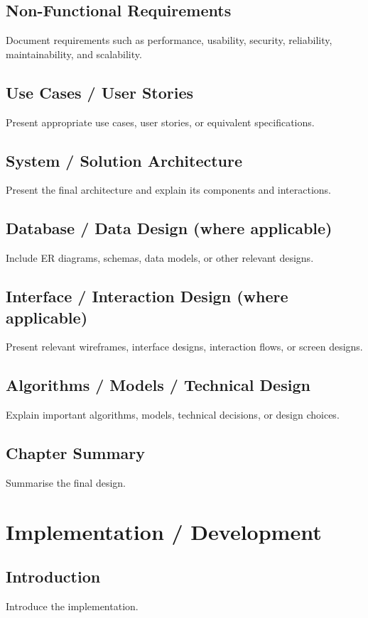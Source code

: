 \documentclass[12pt,a4paper]{report}
\begin{document}
\section{Non-Functional Requirements}
Document requirements such as performance, usability, security, reliability, maintainability, and scalability.

\section{Use Cases / User Stories}
Present appropriate use cases, user stories, or equivalent specifications.

\section{System / Solution Architecture}
Present the final architecture and explain its components and interactions.

\section{Database / Data Design (where applicable)}
Include ER diagrams, schemas, data models, or other relevant designs.

\section{Interface / Interaction Design (where applicable)}
Present relevant wireframes, interface designs, interaction flows, or screen designs.

\section{Algorithms / Models / Technical Design}
Explain important algorithms, models, technical decisions, or design choices.

\section{Chapter Summary}
Summarise the final design.

\chapter{Implementation / Development}

\section{Introduction}
Introduce the implementation.
\end{document}
